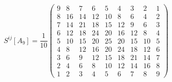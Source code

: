 \begin{equation}
S^{ij}[A_9] = \frac1{10}
\left(\begin{array}{ccccccccc}
   9 & 8 & 7 & 6 & 5 & 4 & 3 & 2 & 1 \\
   8 & 16 & 14 & 12 & 10 & 8 & 6 & 4 & 2 \\
   7 & 14 & 21 & 18 & 15 & 12 & 9 & 6 & 3 \\
   6 & 12 & 18 & 24 & 20 & 16 & 12 & 8 & 4 \\
   5 & 10 & 15 & 20 & 25 & 20 & 15 & 10 & 5 \\
   4 & 8 & 12 & 16 & 20 & 24 & 18 & 12 & 6 \\
   3 & 6 & 9 & 12 & 15 & 18 & 21 & 14 & 7 \\
   2 & 4 & 6 & 8 & 10 & 12 & 14 & 16 & 8 \\
   1 & 2 & 3 & 4 & 5 & 6 & 7 & 8 & 9
\end{array}\right)
\end{equation}

